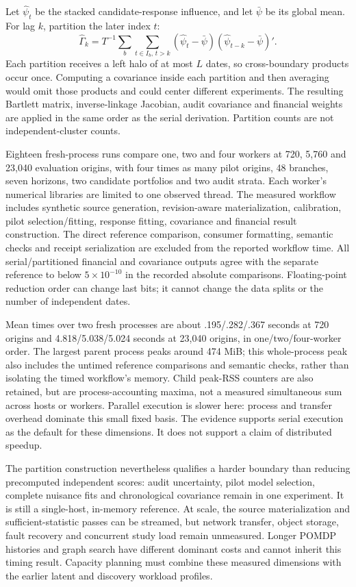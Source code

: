 Let $\hat\psi_t$ be the stacked candidate-response influence, and let
$\bar\psi$ be its global mean. For lag $k$, partition the later index $t$:
\[
 \hat\Gamma_k=T^{-1}\sum_b\sum_{t\in I_b,\,t>k}
   (\hat\psi_t-\bar\psi)(\hat\psi_{t-k}-\bar\psi)'.
\]
Each partition receives a left halo of at most $L$ dates, so cross-boundary
products occur once. Computing a covariance inside each partition and then
averaging would omit those products and could center different experiments.
The resulting Bartlett matrix, inverse-linkage Jacobian, audit covariance
and financial weights are applied in the same order as the serial derivation.
Partition counts are not independent-cluster counts.

Eighteen fresh-process runs compare one, two and four workers at 720,
5,760 and 23,040 evaluation origins, with four times as many pilot origins,
48 branches, seven horizons, two candidate portfolios and two audit strata.
Each worker's numerical libraries are limited to one observed thread.
The measured workflow includes synthetic source generation, revision-aware
materialization, calibration, pilot selection/fitting, response fitting,
covariance and financial result construction. The direct reference comparison,
consumer formatting, semantic checks and receipt serialization are excluded
from the reported workflow time.
All serial/partitioned financial and covariance outputs agree with the
separate reference to below $5\times10^{-10}$ in the recorded absolute
comparisons. Floating-point reduction order can change last bits; it cannot
change the data splits or the number of independent dates.

Mean times over two fresh processes are about .195/.282/.367 seconds at
720 origins and 4.818/5.038/5.024 seconds at 23,040 origins, in
one/two/four-worker order. The largest parent process peaks around 474 MiB;
this whole-process peak also includes the untimed reference comparisons and
semantic checks, rather than isolating the timed workflow's memory.
Child peak-RSS counters are also retained, but are process-accounting maxima,
not a measured simultaneous sum across hosts or workers. Parallel execution
is slower here: process and transfer overhead dominate this small fixed
basis. The evidence supports serial execution as the default for these
dimensions. It does not support a claim of distributed speedup.

The partition construction nevertheless qualifies a harder boundary than
reducing precomputed independent scores: audit uncertainty, pilot model
selection, complete nuisance fits and chronological covariance remain in
one experiment. It is still a single-host, in-memory reference. At scale,
the source materialization and sufficient-statistic passes can be streamed,
but network transfer, object storage, fault recovery and concurrent study
load remain unmeasured. Longer POMDP histories and graph search have
different dominant costs and cannot inherit this timing result. Capacity
planning must combine these measured dimensions with the earlier latent
and discovery workload profiles.


